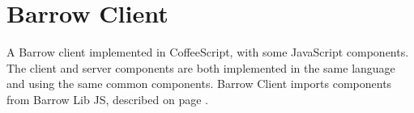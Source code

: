\chapter{Barrow Client}

A Barrow client implemented in CoffeeScript, with some JavaScript components. The
client and server components are both implemented in the same language and using
the same common components. Barrow Client imports components from Barrow Lib JS, described
on page \pageref{chapter-barrow_lib_js}.
